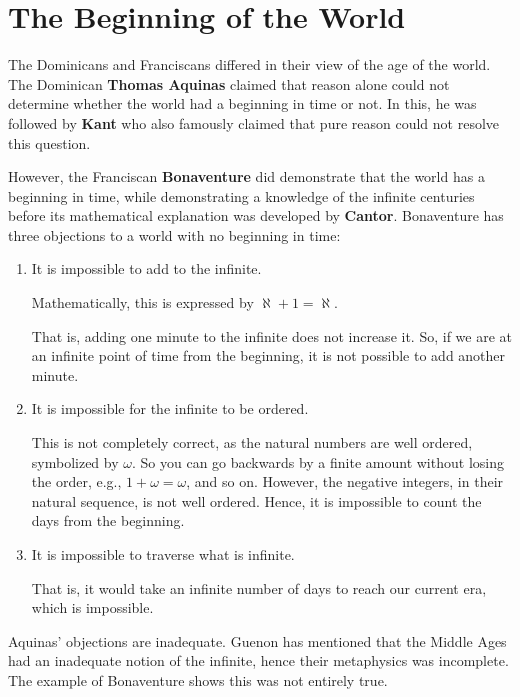 \section{The Beginning of the World}

The Dominicans and Franciscans differed in their view of the age of the world. The Dominican \textbf{Thomas Aquinas} claimed that reason alone could not determine whether the world had a beginning in time or not. In this, he was followed by \textbf{Kant} who also famously claimed that pure reason could not resolve this question.

However, the Franciscan \textbf{Bonaventure} did demonstrate that the world has a beginning in time, while demonstrating a knowledge of the infinite centuries before its mathematical explanation was developed by \textbf{Cantor}. Bonaventure has three objections to a world with no beginning in time:

\begin{enumerate}


\item It is impossible to add to the infinite.

Mathematically, this is expressed by $\aleph + 1 = \aleph$.

That is, adding one minute to the infinite does not increase it. So, if we are at an infinite point of time from the beginning, it is not possible to add another minute.

\item It is impossible for the infinite to be ordered.

This is not completely correct, as the natural numbers are well ordered, symbolized by $\omega$. So you can go backwards by a finite amount without losing the order, e.g., $1 + \omega = \omega$, and so on. However, the negative integers, in their natural sequence, is not well ordered. Hence, it is impossible to count the days from the beginning.

\item It is impossible to traverse what is infinite.

That is, it would take an infinite number of days to reach our current era, which is impossible.
\end{enumerate}

Aquinas' objections are inadequate. Guenon has mentioned that the Middle Ages had an inadequate notion of the infinite, hence their metaphysics was incomplete. The example of Bonaventure shows this was not entirely true.

